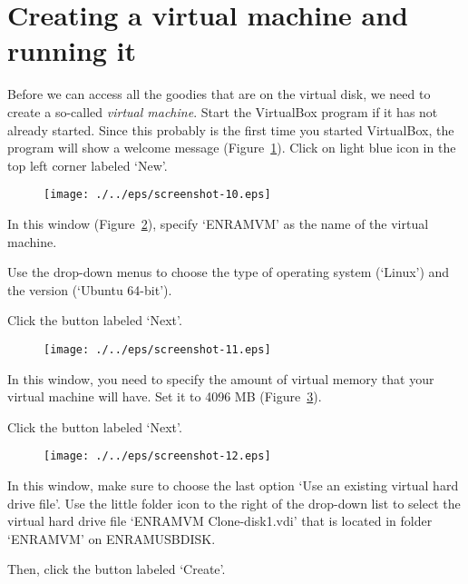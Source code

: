 \section{Creating a virtual machine and running it}
\label{sec:creating-virtual-machine}

Before we can access all the goodies that are on the virtual disk, we need to create a so-called \textit{virtual machine}. Start the VirtualBox program if it has not already started. Since this probably is the first time you started VirtualBox, the program will show a welcome message (Figure~\ref{fig:screenshot-10}). Click on light blue icon in the top left corner labeled `New'.

\begin{figure}[ht]
  \centering
    \texttt{[image: ./../eps/screenshot-10.eps]}
  \caption{}
  \label{fig:screenshot-10}
\end{figure}


In this window (Figure~\ref{fig:screenshot-11}), specify `ENRAMVM' as the name of the virtual machine.

Use the drop-down menus to choose the type of operating system (`Linux') and the version (`Ubuntu 64-bit').

Click the button labeled `Next'.


\begin{figure}[ht]
  \centering
    \texttt{[image: ./../eps/screenshot-11.eps]}
  \caption{}
  \label{fig:screenshot-11}
\end{figure}
\clearpage

In this window, you need to specify the amount of virtual memory that your virtual machine will have. Set it to 4096 MB (Figure~\ref{fig:screenshot-12}).

Click the button labeled `Next'.

\begin{figure}[ht]
  \centering
    \texttt{[image: ./../eps/screenshot-12.eps]}
  \caption{}
  \label{fig:screenshot-12}
\end{figure}


In this window, make sure to choose the last option `Use an existing virtual hard drive file'. Use the little folder icon to the right of the drop-down list to select the virtual hard drive file `ENRAMVM Clone-disk1.vdi' that is located in folder `ENRAMVM' on ENRAMUSBDISK.

Then, click the button labeled `Create'.

